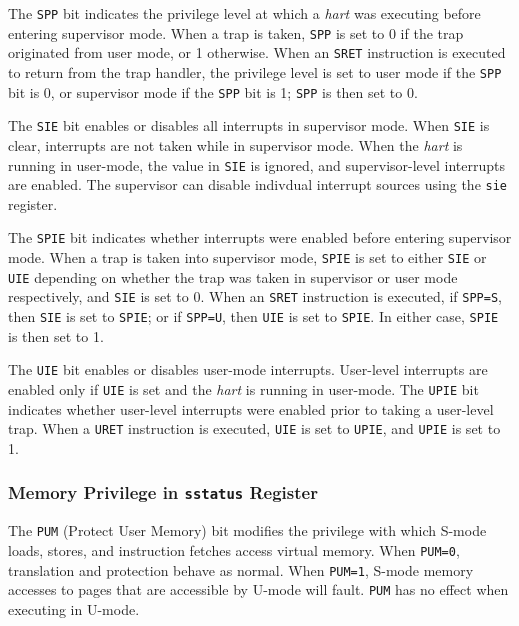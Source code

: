 \fi

The \texttt{SPP} bit indicates the privilege level at which a \emph{hart} was
executing before entering supervisor mode. When a trap is taken, \texttt{SPP} is
set to 0 if the trap originated from user mode, or 1 otherwise. When an
\texttt{SRET} instruction is executed to return from the trap handler, the
privilege level is set to user mode if the \texttt{SPP} bit is 0, or supervisor
mode if the \texttt{SPP} bit is 1; \texttt{SPP} is then set to 0.

The \texttt{SIE} bit enables or disables all interrupts in supervisor mode. When
\texttt{SIE} is clear, interrupts are not taken while in supervisor mode. When
the \emph{hart} is running in user-mode, the value in \texttt{SIE} is ignored,
and supervisor-level interrupts are enabled. The supervisor can disable
indivdual interrupt sources using the \texttt{sie} register.

The \texttt{SPIE} bit indicates whether interrupts were enabled before entering
supervisor mode. When a trap is taken into supervisor mode, \texttt{SPIE} is set
to either \texttt{SIE} or \texttt{UIE} depending on whether the trap was taken in
supervisor or user mode respectively, and \texttt{SIE} is set to 0. When an \texttt{SRET}
instruction is executed, if \texttt{SPP=S}, then \texttt{SIE} is set to \texttt{SPIE}; or if \texttt{SPP=U},
then \texttt{UIE} is set to \texttt{SPIE}. In either case, \texttt{SPIE} is then set to 1.

The \texttt{UIE} bit enables or disables user-mode interrupts. User-level
interrupts are enabled only if \texttt{UIE} is set and the \emph{hart} is
running in user-mode. The \texttt{UPIE} bit indicates whether user-level
interrupts were enabled prior to taking a user-level trap. When a \texttt{URET}
instruction is executed, \texttt{UIE} is set to \texttt{UPIE}, and \texttt{UPIE}
is set to 1.

\subsubsection{Memory Privilege in \texttt{sstatus} Register
}\label{memory-privilege-in-sstatus-register}

The \texttt{PUM} (Protect User Memory) bit modifies the privilege with which
S-mode loads, stores, and instruction fetches access virtual memory. When
\texttt{PUM=0}, translation and protection behave as normal. When
\texttt{PUM=1}, S-mode memory accesses to pages that are accessible by U-mode
will fault. \texttt{PUM} has no effect when executing in U-mode.

